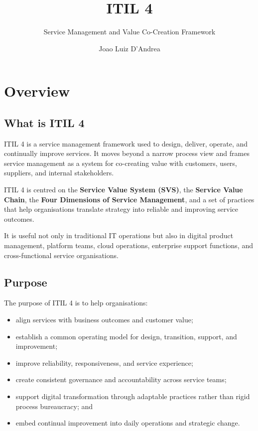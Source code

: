 \documentclass[
  letterpaper,
  DIV=11,
  numbers=noendperiod]{scrartcl}
\title{ITIL 4}
\subtitle{Service Management and Value Co-Creation Framework}
\author{Joao Luiz D'Andrea}
\date{}
\providecommand{\tightlist}{%
  \setlength{\itemsep}{0pt}\setlength{\parskip}{0pt}}
\renewcommand*\contentsname{Table of contents}
\newcommand\contentsname{Table of contents}
\begin{document}
\maketitle

\renewcommand*\contentsname{Table of contents}
{
\hypersetup{linkcolor=}
\setcounter{tocdepth}{3}
\tableofcontents
}

\section{Overview}\label{overview}

\subsection{What is ITIL 4}\label{what-is-itil-4}

ITIL 4 is a service management framework used to design, deliver,
operate, and continually improve services. It moves beyond a narrow
process view and frames service management as a system for co-creating
value with customers, users, suppliers, and internal stakeholders.

ITIL 4 is centred on the \textbf{Service Value System (SVS)}, the
\textbf{Service Value Chain}, the \textbf{Four Dimensions of Service
Management}, and a set of practices that help organisations translate
strategy into reliable and improving service outcomes.

It is useful not only in traditional IT operations but also in digital
product management, platform teams, cloud operations, enterprise support
functions, and cross-functional service organisations.

\subsection{Purpose}\label{purpose}

The purpose of ITIL 4 is to help organisations:

\begin{itemize}
\tightlist
\item
  align services with business outcomes and customer value;
\item
  establish a common operating model for design, transition, support,
  and improvement;
\item
  improve reliability, responsiveness, and service experience;
\item
  create consistent governance and accountability across service teams;
\item
  support digital transformation through adaptable practices rather than
  rigid process bureaucracy; and
\item
  embed continual improvement into daily operations and strategic
  change.
\end{itemize}
\end{document}
